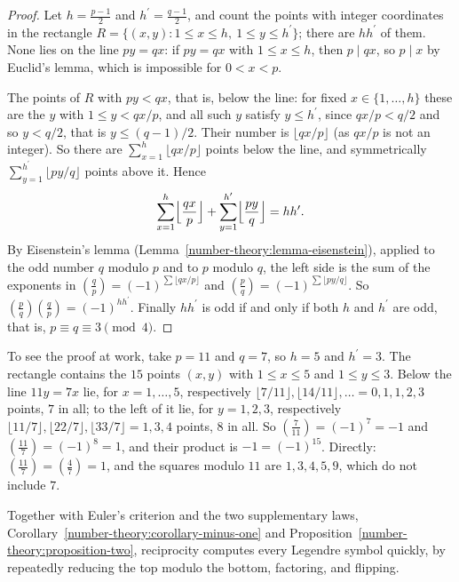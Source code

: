 \begin{proof}
Let $h = \frac{p-1}{2}$ and $h^{\prime} = \frac{q-1}{2}$, and count the points with integer coordinates in the rectangle $R = \{(x, y) : 1 \leq x \leq h, \ 1 \leq y \leq h^{\prime}\}$; there are $hh^{\prime}$
of them. None lies on the line $py = qx$: if $py = qx$ with $1 \leq x \leq h$, then $p \mid qx$, so $p \mid x$ by Euclid's lemma, which is impossible for $0 < x < p$.

The points of $R$ with $py < qx$, that is, below the line: for fixed $x \in \{1, \ldots, h\}$ these are the $y$ with $1 \leq y < qx/p$, and all such $y$ satisfy $y \leq h^{\prime}$, since
$qx/p < q/2$ and so $y < q/2$, that is $y \leq (q - 1)/2$. Their number is $\lfloor qx/p\rfloor$ (as $qx/p$ is not an integer). So there are $\sum_{x=1}^{h}\lfloor qx/p\rfloor$ points below the line, and
symmetrically $\sum_{y=1}^{h^{\prime}}\lfloor py/q\rfloor$ points above it. Hence
\[
\sum_{x=1}^{h}\Bigl\lfloor\frac{qx}{p}\Bigr\rfloor + \sum_{y=1}^{h^{\prime}}\Bigl\lfloor\frac{py}{q}\Bigr\rfloor = hh^{\prime} .
\]
By Eisenstein's lemma (Lemma~\ref{number-theory:lemma-eisenstein}), applied to the odd number $q$ modulo $p$ and to $p$ modulo $q$, the left side is the sum of the exponents in
$(\frac{q}{p}) = (-1)^{\sum\lfloor qx/p\rfloor}$ and $(\frac{p}{q}) = (-1)^{\sum\lfloor py/q\rfloor}$. So $(\frac{p}{q})(\frac{q}{p}) = (-1)^{hh^{\prime}}$. Finally $hh^{\prime}$ is odd if and only if both
$h$ and $h^{\prime}$ are odd, that is, $p \equiv q \equiv 3 \pmod 4$.
\end{proof}

To see the proof at work, take $p = 11$ and $q = 7$, so $h = 5$ and $h^{\prime} = 3$. The rectangle contains the $15$ points $(x, y)$ with $1 \leq x \leq 5$ and $1 \leq y \leq 3$. Below the line
$11y = 7x$ lie, for $x = 1, \ldots, 5$, respectively $\lfloor 7/11\rfloor, \lfloor 14/11\rfloor, \ldots = 0, 1, 1, 2, 3$ points, $7$ in all; to the left of it lie, for $y = 1, 2, 3$, respectively
$\lfloor 11/7\rfloor, \lfloor 22/7\rfloor, \lfloor 33/7\rfloor = 1, 3, 4$ points, $8$ in all. So $(\frac{7}{11}) = (-1)^7 = -1$ and $(\frac{11}{7}) = (-1)^8 = 1$, and their product is
$-1 = (-1)^{15}$. Directly: $(\frac{11}{7}) = (\frac{4}{7}) = 1$, and the squares modulo $11$ are $1, 3, 4, 5, 9$, which do not include $7$.

Together with Euler's criterion and the two supplementary laws, Corollary~\ref{number-theory:corollary-minus-one} and Proposition~\ref{number-theory:proposition-two}, reciprocity computes every Legendre symbol
quickly, by repeatedly reducing the top modulo the bottom, factoring, and flipping.

